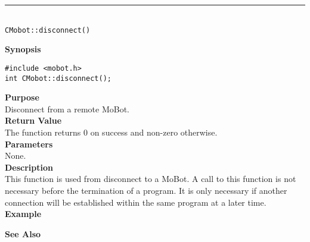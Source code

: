 \noindent
\vspace{5pt}
\rule{4.5in}{0.015in}\\
\noindent
{\LARGE \texttt{CMobot::disconnect()}}\\
{}

\noindent
{\bf Synopsis}\\
\begin{verbatim}
#include <mobot.h>
int CMobot::disconnect();
\end{verbatim}

\noindent
{\bf Purpose}\\
Disconnect from a remote MoBot.\\

\noindent
{\bf Return Value}\\
The function returns 0 on success and non-zero otherwise.\\

\noindent
{\bf Parameters}\\
None.\\

\noindent
{\bf Description}\\
This function is used from disconnect to a MoBot. A call to this function is
not necessary before the termination of a program. It is only necessary if
another connection will be established within the same program at a later time.
\\

\noindent
{\bf Example}\\
\noindent

\noindent
{\bf See Also}\\

